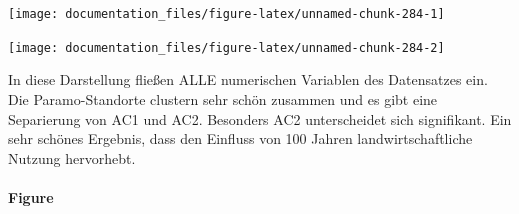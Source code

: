 \documentclass[
]{article}
\newenvironment{Shaded}{\begin{snugshade}}{\end{snugshade}}
\newcommand{\AttributeTok}[1]{\textcolor[rgb]{0.77,0.63,0.00}{#1}}
\newcommand{\CommentTok}[1]{\textcolor[rgb]{0.56,0.35,0.01}{\textit{#1}}}
\newcommand{\ConstantTok}[1]{\textcolor[rgb]{0.00,0.00,0.00}{#1}}
\newcommand{\FunctionTok}[1]{\textcolor[rgb]{0.00,0.00,0.00}{#1}}
\newcommand{\NormalTok}[1]{#1}
\newcommand{\SpecialCharTok}[1]{\textcolor[rgb]{0.00,0.00,0.00}{#1}}
\newcommand{\StringTok}[1]{\textcolor[rgb]{0.31,0.60,0.02}{#1}}
\begin{document}
\begin{center}\texttt{[image: documentation\_files/figure-latex/unnamed-chunk-284-1]} \end{center}

\begin{Shaded}
\end{Shaded}

\begin{center}\texttt{[image: documentation\_files/figure-latex/unnamed-chunk-284-2]} \end{center}

In diese Darstellung fließen ALLE numerischen Variablen des Datensatzes ein. Die Paramo-Standorte clustern sehr schön zusammen und es gibt eine Separierung von AC1 und AC2. Besonders AC2 unterscheidet sich signifikant. Ein sehr schönes Ergebnis, dass den Einfluss von 100 Jahren landwirtschaftliche Nutzung hervorhebt.

\hypertarget{figure}{%
\paragraph{Figure}\label{figure}}
\end{document}
